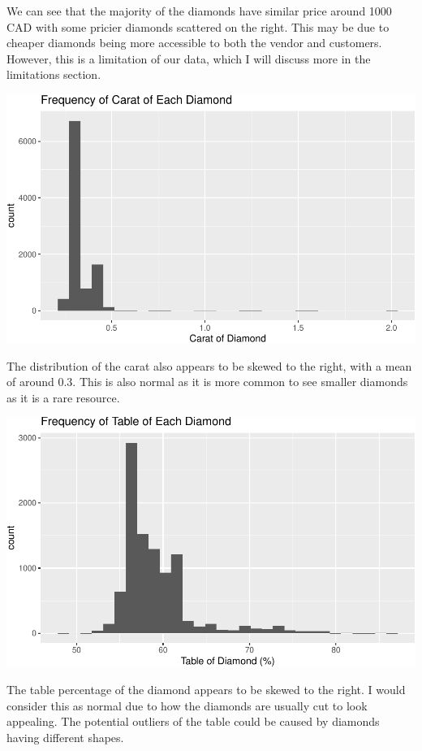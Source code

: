 \documentclass[
]{article}
\begin{document}
We can see that the majority of the diamonds have similar price around
1000 CAD with some pricier diamonds scattered on the right. This may be
due to cheaper diamonds being more accessible to both the vendor and
customers. However, this is a limitation of our data, which I will
discuss more in the limitations section.

\begin{center}\includegraphics[width=0.8\linewidth]{Methods_and_Results_files/figure-latex/unnamed-chunk-5-1} \end{center}

The distribution of the carat also appears to be skewed to the right,
with a mean of around 0.3. This is also normal as it is more common to
see smaller diamonds as it is a rare resource.

\begin{center}\includegraphics[width=0.8\linewidth]{Methods_and_Results_files/figure-latex/unnamed-chunk-6-1} \end{center}

The table percentage of the diamond appears to be skewed to the right. I
would consider this as normal due to how the diamonds are usually cut to
look appealing. The potential outliers of the table could be caused by
diamonds having different shapes.
\end{document}
